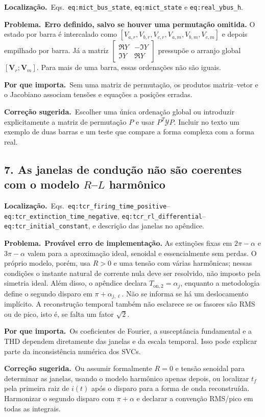 \documentclass[11pt,a4paper]{article}
\newcommand{\localizacao}{\textbf{Localização.}\ }
\newcommand{\problema}{\textbf{Problema.}\ }
\newcommand{\impacto}{\textbf{Por que importa.}\ }
\newcommand{\correcao}{\textbf{Correção sugerida.}\ }
\begin{document}
\localizacao Eqs.~\texttt{eq:mict\_bus\_state},
\texttt{eq:mict\_state} e \texttt{eq:real\_ybus\_h}.

\problema \textbf{Erro definido, salvo se houver uma permutação omitida.} O
estado por barra é intercalado como
$[V_{a,r},V_{b,r},V_{c,r},V_{a,m},V_{b,m},V_{c,m}]$ e depois empilhado por
barra. Já a matriz
$\begin{bmatrix}\Re Y&-\Im Y\\\Im Y&\Re Y\end{bmatrix}$ pressupõe o arranjo
global $[\mathbf V_r;\mathbf V_m]$. Para mais de uma barra, essas ordenações
não são iguais.

\impacto Sem uma matriz de permutação, os produtos matriz--vetor e o Jacobiano
associam tensões e equações a posições erradas.

\correcao Escolher uma única ordenação global ou introduzir explicitamente a
matriz de permutação $P$ e usar $P^T\mathcal YP$. Incluir no texto um exemplo
de duas barras e um teste que compare a forma complexa com a forma real.

\subsection*{7. As janelas de condução não são coerentes com o modelo $R$--$L$ harmônico}

\localizacao Eqs.~\texttt{eq:tcr\_firing\_time\_positive}--
\texttt{eq:tcr\_extinction\_time\_negative},
\texttt{eq:tcr\_rl\_differential}--
\texttt{eq:tcr\_initial\_constant}, e descrição das janelas no apêndice.

\problema \textbf{Provável erro de implementação.} As extinções fixas em
$2\pi-\alpha$ e $3\pi-\alpha$ valem para a aproximação ideal, senoidal e
essencialmente sem perdas. O próprio modelo, porém, usa $R>0$ e uma tensão com
várias harmônicas; nessas condições o instante natural de corrente nula deve
ser resolvido, não imposto pela simetria ideal. Além disso, o apêndice declara
$T_{\mathrm{on},2}=\alpha_j$, enquanto a metodologia define o segundo disparo
em $\pi+\alpha_{j,\ell}$. Não se informa se há um deslocamento implícito. A
reconstrução temporal também não esclarece se os fasores são RMS ou de pico,
isto é, se falta um fator $\sqrt 2$.

\impacto Os coeficientes de Fourier, a susceptância fundamental e a THD
dependem diretamente das janelas e da escala temporal. Isso pode explicar
parte da inconsistência numérica dos SVCs.

\correcao Ou assumir formalmente $R=0$ e tensão senoidal para determinar as
janelas, usando o modelo harmônico apenas depois, ou localizar
$t_f$ pela primeira raiz de $i(t)$ após o disparo para a forma de onda
reconstruída. Harmonizar o segundo disparo com $\pi+\alpha$ e declarar a
convenção RMS/pico em todas as integrais.
\end{document}
